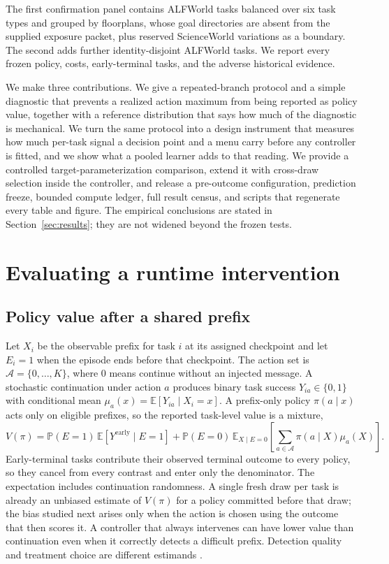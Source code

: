 \documentclass{article}
\begin{document}
The first confirmation panel contains \AlfPlanned{} ALFWorld tasks balanced over six task types and grouped by \AlfGroups{} floorplans, whose goal directories are absent from the supplied exposure packet, plus \SwPlanned{} reserved ScienceWorld variations as a boundary. The second adds \EventPlanned{} further identity-disjoint ALFWorld tasks. We report every frozen policy, costs, early-terminal tasks, and the adverse historical evidence.

We make three contributions. We give a repeated-branch protocol and a simple diagnostic that prevents a realized action maximum from being reported as policy value, together with a reference distribution that says how much of the diagnostic is mechanical. We turn the same protocol into a design instrument that measures how much per-task signal a decision point and a menu carry before any controller is fitted, and we show what a pooled learner adds to that reading. We provide a controlled target-parameterization comparison, extend it with cross-draw selection inside the controller, and release a pre-outcome configuration, prediction freeze, bounded compute ledger, full result census, and scripts that regenerate every table and figure. The empirical conclusions are stated in Section~\ref{sec:results}; they are not widened beyond the frozen tests.

\section{Evaluating a runtime intervention}
\label{sec:estimand}

\subsection{Policy value after a shared prefix}

Let $X_i$ be the observable prefix for task $i$ at its assigned checkpoint and let $E_i=1$ when the episode ends before that checkpoint. The action set is $\mathcal{A}=\{0,\ldots,K\}$, where $0$ means continue without an injected message. A stochastic continuation under action $a$ produces binary task success $Y_{ia}\in\{0,1\}$ with conditional mean $\mu_a(x)=\mathbb{E}[Y_{ia}\mid X_i=x]$. A prefix-only policy $\pi(a\mid x)$ acts only on eligible prefixes, so the reported task-level value is a mixture,
\begin{equation}
V(\pi)=\mathbb{P}(E=1)\,\mathbb{E}\!\left[Y^{\mathrm{early}}\mid E=1\right]
+\mathbb{P}(E=0)\,\mathbb{E}_{X\mid E=0}\!\left[\sum_{a\in\mathcal{A}}\pi(a\mid X)\mu_a(X)\right].
\label{eq:policy-value}
\end{equation}
Early-terminal tasks contribute their observed terminal outcome to every policy, so they cancel from every contrast and enter only the denominator. The expectation includes continuation randomness. A single fresh draw per task is already an unbiased estimate of $V(\pi)$ for a policy committed before that draw; the bias studied next arises only when the action is chosen using the outcome that then scores it. A controller that always intervenes can have lower value than continuation even when it correctly detects a difficult prefix. Detection quality and treatment choice are different estimands \citep{vasudev2026failure}.
\end{document}
